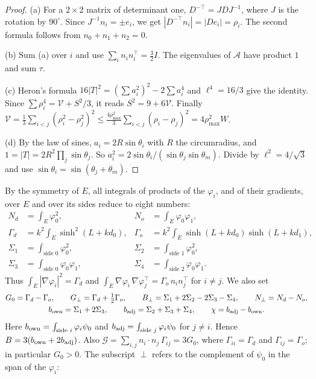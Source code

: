 \documentclass[11pt]{article}
\theoremstyle{remark}
\newcommand{\E}{E}
\newcommand{\Gp}{G_{\perp}}
\newcommand{\Bp}{B_{\perp}}
\newcommand{\Np}{N_{\perp}}
\begin{document}
\begin{proof}
(a) For a $2\times2$ matrix of determinant one, $D^{-\top}=JDJ^{-1}$, where $J$ is the rotation by
$90^\circ$. Since $J^{-1}n_i=\pm e_i$, we get $|D^{-\top}n_i|=|De_i|=\rho_i$. The second formula follows
from $n_0+n_1+n_2=0$.

(b) Sum (a) over $i$ and use $\sum_in_in_i^\top=\frac32I$. The eigenvalues of $\mathcal A$ have product
$1$ and sum $\tau$.

(c) Heron's formula $16|T|^2=(\sum a_i^2)^2-2\sum a_i^4$ and $\ell^4=16/3$ give the identity. Since
$\sum\rho_i^4=\mathcal V+S^2/3$, it reads $S^2=9+6\mathcal V$. Finally
$\mathcal V=\frac13\sum_{i<j}(\rho_i^2-\rho_j^2)^2\le\frac{4\rho_{\max}^2}3\sum_{i<j}(\rho_i-\rho_j)^2
=4\rho_{\max}^2W$.

(d) By the law of sines, $a_i=2R\sin\theta_i$ with $R$ the circumradius, and $1=|T|=2R^2\prod_j\sin\theta_j$.
So $a_i^2=2\sin\theta_i/(\sin\theta_j\sin\theta_m)$. Divide by $\ell^2=4/\sqrt3$ and use
$\sin\theta_i=\sin(\theta_j+\theta_m)$.
\end{proof}

By the symmetry of $\E$, all integrals of products of the $\varphi_i$, and of their gradients, over $\E$
and over its sides reduce to eight numbers:
\begin{align*}
 N_d&=\int_\E\varphi_0^2, & N_o&=\int_\E\varphi_0\varphi_1, \\
 \Gamma_d&=k^2\!\int_\E\sinh^2(L+kd_0), & \Gamma_o&=k^2\!\int_\E\sinh(L+kd_0)\sinh(L+kd_1),\\
 \Sigma_1&=\int_{\text{side }0}\varphi_0^2, & \Sigma_2&=\int_{\text{side }1}\varphi_0^2,\\
 \Sigma_3&=\int_{\text{side }0}\varphi_0\varphi_1, & \Sigma_4&=\int_{\text{side }2}\varphi_0\varphi_1 .
\end{align*}
Thus $\int_\E|\nabla\varphi_i|^2=\Gamma_d$ and $\int_\E\nabla\varphi_i\,\nabla\varphi_j^\top=\Gamma_o\,n_in_j^\top$
for $i\ne j$. We also set
\begin{gather*}
 G_0=\Gamma_d-\Gamma_o,\qquad \Gp=\Gamma_d+\tfrac12\Gamma_o,\qquad
 \Bp=\Sigma_1+2\Sigma_2-2\Sigma_3-\Sigma_4,\qquad \Np=N_d-N_o,\\
 b_{\rm own}=\Sigma_1+2\Sigma_3,\qquad b_{\rm adj}=\Sigma_2+\Sigma_3+\Sigma_4,\qquad
 \chi=b_{\rm adj}-b_{\rm own} .
\end{gather*}
Here $b_{\rm own}=\int_{\text{side }i}\varphi_i\psi_0$ and $b_{\rm adj}=\int_{\text{side }j}\varphi_i\psi_0$ for
$j\ne i$. Hence $B=3(b_{\rm own}+2b_{\rm adj})$. Also $\mathcal G=\sum_{i,j}n_i\cdot n_j\,\Gamma_{ij}=3G_0$,
where $\Gamma_{ii}=\Gamma_d$ and $\Gamma_{ij}=\Gamma_o$; in particular $G_0>0$. The subscript $\perp$ refers to
the complement of $\psi_0$ in the span of the $\varphi_i$:
\end{document}
